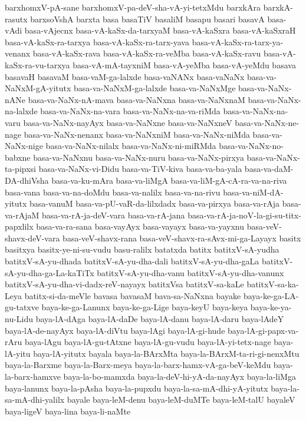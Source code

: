 {barxhomxV-pA-sane
barxhomxV-pa-deV-sha-vA-yi-tetxMdu
barxkAra
barxkA-rasutx
barxsoVshA
barxta
basa
basaTiV
basaliM
basapu
basari
basavA
basa-vAdi
basa-vAjecnx
basa-vA-kaSx-da-tarxyaM
basa-vA-kaSxra
basa-vA-kaSxraH
basa-vA-kaSx-ra-tarxya
basa-vA-kaSx-ra-tarx-yava
basa-vA-kaSx-ra-tarx-ya-venanx
basa-vA-kaSx-rava
basa-vA-kaSx-ra-veMba
basa-vA-kaSx-ravu
basa-vA-kaSx-ra-vu-tarxya
basa-vA-mA-tayxniM
basa-vA-yeMba
basa-vA-yeMdu
basava
basavaH
basavaM
basa-vaM-ga-lalxde
basa-vaNANx
basa-vaNaNx
basa-va-NaNxM-gA-yitutx
basa-va-NaNxM-ga-lalxde
basa-va-NaNxMge
basa-va-NaNx-nANe
basa-va-NaNx-nA-mava
basa-va-NaNxna
basa-va-NaNxnaM
basa-va-NaNx-na-lalxde
basa-va-NaNx-na-vara
basa-va-NaNx-na-va-riMda
basa-va-NaNx-na-varu
basa-va-NaNx-nayAyx
basa-va-NaNxne
basa-va-NaNxneV
basa-va-NaNx-ne-nage
basa-va-NaNx-nenanx
basa-va-NaNxniM
basa-va-NaNx-niMda
basa-va-NaNx-nige
basa-va-NaNx-nilalx
basa-va-NaNx-ni-miRMda
basa-va-NaNx-no-babxne
basa-va-NaNxnu
basa-va-NaNx-nuru
basa-va-NaNx-pirxya
basa-va-NaNx-ta-pipxsi
basa-va-NaNx-vi-Didu
basa-va-TiV-kiva
basa-va-ba-yala
basa-va-daM-DA-dhiVsha
basa-va-ku-mAra
basa-va-liMgA
basa-va-liM-gA-cA-ra-va-na-riva
basa-vana
basa-va-na-doMdu
basa-va-nalilx
basa-va-na-rivu
basa-va-niM-dA-yitutx
basa-vanuM
basa-va-pU-vaR-da-lilxdadx
basa-va-pirxya
basa-va-rAja
basa-va-rAjaM
basa-va-rA-ja-deV-vara
basa-va-rA-jana
basa-va-rA-ja-noV-la-gi-su-titx-papxlilx
basa-va-ra-sana
basa-vayAyx
basa-vayayx
basa-va-yayxnu
basa-veV-shavx-deV-vara
basa-veV-shavx-rana
basa-veV-shavx-ra-sAvx-mi-ga-Layayx
basitx
basitxya
basitx-ye-ni-su-vudu
basu-ralilx
batatxda
batitx
batitxV-sA-yudha
batitxV-sA-yu-dhada
batitxV-sA-yu-dha-dali
batitxV-sA-yu-dha-gaLa
batitxV-sA-yu-dha-ga-La-kaTiTx
batitxV-sA-yu-dha-vanu
batitxV-sA-yu-dha-vanunx
batitxV-sA-yu-dha-vi-dadx-reV-nayayx
batitxVsa
batitxV-sa-kaLe
batitxV-sa-ka-Leya
batitx-si-da-meVle
bavasa
bavasaM
bava-sa-NaNxna
bayake
baya-ke-ga-LA-gu-tatxve
baya-ke-ga-Lanunx
baya-ke-ga-Lige
baya-keyU
baya-keya
baya-ke-ya-nu-Lidu
baya-lA-dAga
baya-lA-daDe
baya-lA-danu
baya-lA-daru
baya-lAdeY
baya-lA-de-nayAyx
baya-lA-diVtu
baya-lAgi
baya-lA-gi-hude
baya-lA-gi-papx-va-rAru
baya-lAgu
baya-lA-gu-tAtxne
baya-lA-gu-vudu
baya-lA-yi-tetx-nage
baya-lA-yitu
baya-lA-yitutx
bayala
baya-la-BArxMta
baya-la-BArxM-ta-ri-gi-nenxMtu
baya-la-Barxme
baya-la-Barx-meya
baya-la-barx-hamx-vA-ga-beV-keMdu
baya-la-barx-hamxve
baya-la-bo-mamxda
baya-la-deV-hi-yA-da-nayAyx
baya-la-liMga
baya-lanunx
baya-la-pAsha
baya-la-pupxdu
baya-la-sa-mA-dhi-yA-yitutx
baya-la-sa-mA-dhi-yalilx
bayale
baya-leM-denu
baya-leM-duMTe
baya-leM-talU
bayaleV
baya-ligeV
baya-lina
baya-li-naMte
}

